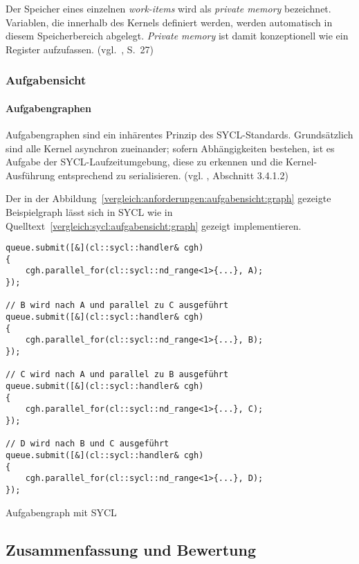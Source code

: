 Der Speicher eines einzelnen \textit{work-items} wird als
\textit{private memory} bezeichnet. Variablen, die innerhalb des Kernels
definiert werden, werden automatisch in diesem Speicherbereich abgelegt.
\textit{Private memory} ist damit konzeptionell wie ein Register aufzufassen.
(vgl.~\cite{syclspec}, S.\ 27)

\subsubsection{Aufgabensicht}
\label{vergleich:sycl:aufgabensicht}

\paragraph{Aufgabengraphen}

Aufgabengraphen sind ein inhärentes Prinzip des SYCL-Standards. Grundsätzlich
sind alle Kernel asynchron zueinander; sofern Abhängigkeiten bestehen, ist es
Aufgabe der SYCL-Laufzeitumgebung, diese zu erkennen und die Kernel-Ausführung
entsprechend zu serialisieren. (vgl. \cite{syclspec}, Abschnitt 3.4.1.2)

Der in der Abbildung~\ref{vergleich:anforderungen:aufgabensicht:graph} gezeigte
Beispielgraph lässt sich in SYCL wie in
Quelltext~\ref{vergleich:sycl:aufgabensicht:graph} gezeigt implementieren.

\begin{code}
    \begin{verbatim}
queue.submit([&](cl::sycl::handler& cgh)
{
    cgh.parallel_for(cl::sycl::nd_range<1>{...}, A);
});

// B wird nach A und parallel zu C ausgeführt
queue.submit([&](cl::sycl::handler& cgh)
{
    cgh.parallel_for(cl::sycl::nd_range<1>{...}, B);
});

// C wird nach A und parallel zu B ausgeführt
queue.submit([&](cl::sycl::handler& cgh)
{
    cgh.parallel_for(cl::sycl::nd_range<1>{...}, C);
});

// D wird nach B und C ausgeführt
queue.submit([&](cl::sycl::handler& cgh)
{
    cgh.parallel_for(cl::sycl::nd_range<1>{...}, D);
});
    \end{verbatim}
    \caption{Aufgabengraph mit SYCL}
    \label{vergleich:sycl:aufgabensicht:graph}
\end{code}

\subsection{Zusammenfassung und Bewertung}
\label{vergleich:zusammenfassung}

